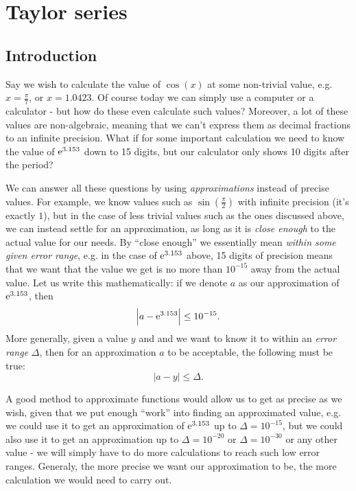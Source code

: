 \section{Taylor series}
\subsection{Introduction}
Say we wish to calculate the value of $\cos(x)$ at some non-trivial value, e.g. $x=\frac{\pi}{7}$, or $x=1.0423$. Of course today we can simply use a computer or a calculator - but how do these even calculate such values? Moreover, a lot of these values are non-algebraic, meaning that we can't express them as decimal fractions to an infinite precision. What if for some important calculation we need to know the value of $\mathrm{e}^{3.153}$ down to 15 digits, but our calculator only shows 10 digits after the period?

We can answer all these questions by using \emph{approximations} instead of precise values. For example, we know values such as $\sin\left(\frac{\pi}{2}\right)$ with infinite precision (it's exactly $1$), but in the case of less trivial values such as the ones discussed above, we can instead settle for an approximation, as long as it is \textit{close enough} to the actual value for our needs. By ``close enough'' we essentially mean \textit{within some given error range}, e.g. in the case of $\mathrm{e}^{3.153}$ above, 15 digits of precision means that we want that the value we get is no more than $10^{-15}$ away from the actual value. Let us write this mathematically: if we denote $a$ as our approximation of $\mathrm{e}^{3.153}$, then
\[
  \left| a-\mathrm{e}^{3.153}\right| \leq 10^{-15}.
\]
More generally, given a value $y$ and and we want to know it to within an \emph{error range} $\Delta$, then for an approximation $a$ to be acceptable, the following must be true:
\begin{equation}
  \left| a-y \right| \leq \Delta.
  \label{eq:error_range}
\end{equation}

A good method to approximate functions would allow us to get as precise as we wish, given that we put enough ``work'' into finding an approximated value, e.g. we could use it to get an approximation of $\mathrm{e}^{3.153}$ up to $\Delta=10^{-15}$, but we could also use it to get an approximation up to $\Delta=10^{-20}$ or $\Delta=10^{-30}$ or any other value - we will simply have to do more calculations to reach such low error ranges. Generaly, the more precise we want our approximation to be, the more calculation we would need to carry out.

